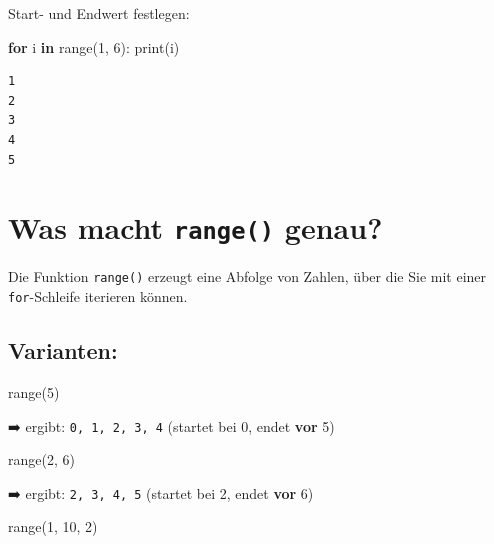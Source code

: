 \documentclass[
  letterpaper,
  DIV=11,
  numbers=noendperiod]{scrreprt}
\newenvironment{Shaded}{\begin{snugshade}}{\end{snugshade}}
\newcommand{\BuiltInTok}[1]{\textcolor[rgb]{0.00,0.23,0.31}{#1}}
\newcommand{\ControlFlowTok}[1]{\textcolor[rgb]{0.00,0.23,0.31}{\textbf{#1}}}
\newcommand{\DecValTok}[1]{\textcolor[rgb]{0.68,0.00,0.00}{#1}}
\newcommand{\KeywordTok}[1]{\textcolor[rgb]{0.00,0.23,0.31}{\textbf{#1}}}
\newcommand{\NormalTok}[1]{\textcolor[rgb]{0.00,0.23,0.31}{#1}}
\begin{document}
Start- und Endwert festlegen:

\begin{Shaded}
\begin{Highlighting}[]
\ControlFlowTok{for}\NormalTok{ i }\KeywordTok{in} \BuiltInTok{range}\NormalTok{(}\DecValTok{1}\NormalTok{, }\DecValTok{6}\NormalTok{):}
    \BuiltInTok{print}\NormalTok{(i)}
\end{Highlighting}
\end{Shaded}

\begin{verbatim}
1
2
3
4
5
\end{verbatim}

\section{\texorpdfstring{Was macht \texttt{range()}
genau?}{Was macht range() genau?}}\label{was-macht-range-genau}

Die Funktion \texttt{range()} erzeugt eine Abfolge von Zahlen, über die
Sie mit einer \texttt{for}-Schleife iterieren können.

\subsection{Varianten:}\label{varianten}

\begin{Shaded}
\begin{Highlighting}[]
\BuiltInTok{range}\NormalTok{(}\DecValTok{5}\NormalTok{)}
\end{Highlighting}
\end{Shaded}

➡️ ergibt: \texttt{0,\ 1,\ 2,\ 3,\ 4} (startet bei 0, endet \textbf{vor}
5)

\begin{Shaded}
\begin{Highlighting}[]
\BuiltInTok{range}\NormalTok{(}\DecValTok{2}\NormalTok{, }\DecValTok{6}\NormalTok{)}
\end{Highlighting}
\end{Shaded}

➡️ ergibt: \texttt{2,\ 3,\ 4,\ 5} (startet bei 2, endet \textbf{vor} 6)

\begin{Shaded}
\begin{Highlighting}[]
\BuiltInTok{range}\NormalTok{(}\DecValTok{1}\NormalTok{, }\DecValTok{10}\NormalTok{, }\DecValTok{2}\NormalTok{)}
\end{Highlighting}
\end{Shaded}
\end{document}
